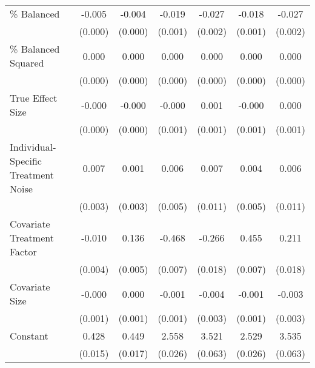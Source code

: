 \begin{table}[htbp]
\begin{tabular}{l*{6}{c}}
\% Balanced         &      -0.005\sym{***}&      -0.004\sym{***}&      -0.019\sym{***}&      -0.027\sym{***}&      -0.018\sym{***}&      -0.027\sym{***}\\
                    &     (0.000)         &     (0.000)         &     (0.001)         &     (0.002)         &     (0.001)         &     (0.002)         \\
\% Balanced Squared &       0.000\sym{***}&       0.000\sym{***}&       0.000\sym{***}&       0.000\sym{***}&       0.000\sym{***}&       0.000\sym{***}\\
                    &     (0.000)         &     (0.000)         &     (0.000)         &     (0.000)         &     (0.000)         &     (0.000)         \\
True Effect Size    &      -0.000         &      -0.000         &      -0.000         &       0.001         &      -0.000         &       0.000         \\
                    &     (0.000)         &     (0.000)         &     (0.001)         &     (0.001)         &     (0.001)         &     (0.001)         \\
Individual-Specific Treatment Noise&       0.007\sym{**} &       0.001         &       0.006         &       0.007         &       0.004         &       0.006         \\
                    &     (0.003)         &     (0.003)         &     (0.005)         &     (0.011)         &     (0.005)         &     (0.011)         \\
Covariate Treatment Factor&      -0.010\sym{*}  &       0.136\sym{***}&      -0.468\sym{***}&      -0.266\sym{***}&       0.455\sym{***}&       0.211\sym{***}\\
                    &     (0.004)         &     (0.005)         &     (0.007)         &     (0.018)         &     (0.007)         &     (0.018)         \\
Covariate Size      &      -0.000         &       0.000         &      -0.001         &      -0.004         &      -0.001         &      -0.003         \\
                    &     (0.001)         &     (0.001)         &     (0.001)         &     (0.003)         &     (0.001)         &     (0.003)         \\
Constant            &       0.428\sym{***}&       0.449\sym{***}&       2.558\sym{***}&       3.521\sym{***}&       2.529\sym{***}&       3.535\sym{***}\\
                    &     (0.015)         &     (0.017)         &     (0.026)         &     (0.063)         &     (0.026)         &     (0.063)         \\

\end{tabular}
\end{table}
